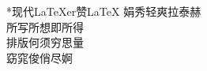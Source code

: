 \documentclass[margin=18pt,
  convert,
  convert={
    outext=.png,
    command=\unexpanded{
      pdftocairo -r 150 -png \infile %
    }
  }
]{standalone}
\begin{document}
\begin{minipage}{6in}
  \centering
  \begin{poem}*{现代}{\LaTeX{}er}{赞\textbullet{}\LaTeX{}}
    娟秀轻爽拉泰赫\\
    所写所想即所得\\
    排版何须穷思量\\
    窈窕俊俏尽婀
  \end{poem}

\end{minipage}
\end{document}
